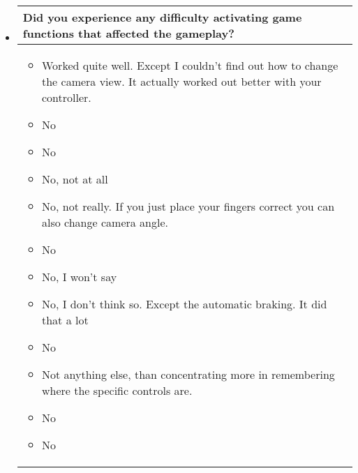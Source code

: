 \begin{itemize}
\begin{table}[!htb]
\begin{tabular}{| p{5.5in} |}
\begin{itemize}
	\end{itemize}
	\\
	\hline
\end{tabular}
\end{table}

\item[]
\begin{table}[!htb]
\centering
\begin{tabular}{| p{5.5in} |}
\hline
	\cellcolor{NotSkyBlue}\textbf{Did you experience any difficulty activating game functions that affected the gameplay?}
	\\
	\hline
	\begin{itemize}
        \item Worked quite well. Except I couldn’t find out how to change the camera view. It actually worked out better with your controller.
        \item No
        \item No
        \item No, not at all
        \item No, not really. If you just place your fingers correct you can also change camera angle.
        \item No
        \item No, I won’t say
        \item No, I don’t think so. Except the automatic braking. It did that a lot
        \item No
        \item Not anything else, than concentrating more in remembering where the specific controls are.
        \item No
        \item No

	\end{itemize}
	\\
	\hline
\end{tabular}
\end{table}


\end{itemize}

